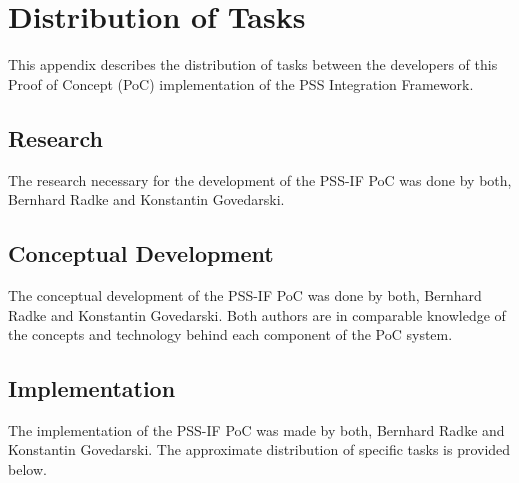 \chapter{Distribution of Tasks}
\label{app:distribution}

This appendix describes the distribution of tasks between the developers of this Proof of Concept (PoC) implementation of the PSS Integration Framework.

\section*{Research}

The research necessary for the development of the PSS-IF PoC was done by both, Bernhard Radke and Konstantin Govedarski.

\section*{Conceptual Development}

The conceptual development of the PSS-IF PoC was done by both, Bernhard Radke and Konstantin Govedarski. Both authors are in comparable knowledge of the concepts and technology behind each component of the PoC system.

\section*{Implementation}

The implementation of the PSS-IF PoC was made by both, Bernhard Radke and Konstantin Govedarski. The approximate distribution of specific tasks is provided below.

